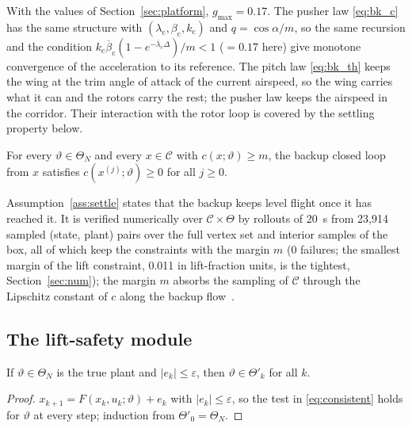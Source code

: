 \documentclass[final,5p,times,twocolumn]{elsarticle}
\newcommand{\numKcGain}{0.17}
\newcommand{\numKrGain}{0.17}
\newcommand{\numSettleFail}{0}
\newcommand{\numSettlePairs}{23,914}
\newcommand{\numSettleWorst}{0.011}
\begin{document}
\noindent With the values of Section~\ref{sec:platform}, $g_{\max}=\numKrGain{}$. The pusher law \eqref{eq:bk_c} has the same structure with $(\lambda_{\mathrm c},\beta_{\mathrm c},k_{\mathrm c})$ and $q=\cos\alpha/m$, so the same recursion and the condition $k_{\mathrm c}\overline\beta_{\mathrm c}(1-e^{-\overline\lambda_{\mathrm c}\Delta})/m<1$ ($=\numKcGain{}$ here) give monotone convergence of the acceleration to its reference. The pitch law \eqref{eq:bk_th} keeps the wing at the trim angle of attack of the current airspeed, so the wing carries what it can and the rotors carry the rest; the pusher law keeps the airspeed in the corridor. Their interaction with the rotor loop is covered by the settling property below.

\begin{assumption}\label{ass:settle}
For every $\vartheta\in\Theta_N$ and every $x\in\mathcal C$ with $c(x;\vartheta)\ge m$, the backup closed loop from $x$ satisfies $c(x^{(j)};\vartheta)\ge0$ for all $j\ge0$.
\end{assumption}
\noindent Assumption~\ref{ass:settle} states that the backup keeps level flight once it has reached it. It is verified numerically over $\mathcal C\times\Theta$ by rollouts of \SI{20}{s} from \numSettlePairs{} sampled (state, plant) pairs over the full vertex set and interior samples of the box, all of which keep the constraints with the margin $m$ (\numSettleFail{} failures; the smallest margin of the lift constraint, \numSettleWorst{} in lift-fraction units, is the tightest, Section~\ref{sec:num}); the margin $m$ absorbs the sampling of $\mathcal C$ through the Lipschitz constant of $c$ along the backup flow~\cite{Bobiti2018}.

\subsection{The lift-safety module}
\begin{lemma}\label{lem:cons}
If $\vartheta\in\Theta_N$ is the true plant and $|e_k|\le\varepsilon$, then $\vartheta\in\Theta'_k$ for all $k$.
\end{lemma}
\begin{proof}
$x_{k+1}=F(x_k,u_k;\vartheta)+e_k$ with $|e_k|\le\varepsilon$, so the test in \eqref{eq:consistent} holds for $\vartheta$ at every step; induction from $\Theta'_0=\Theta_N$.
\end{proof}
\end{document}
